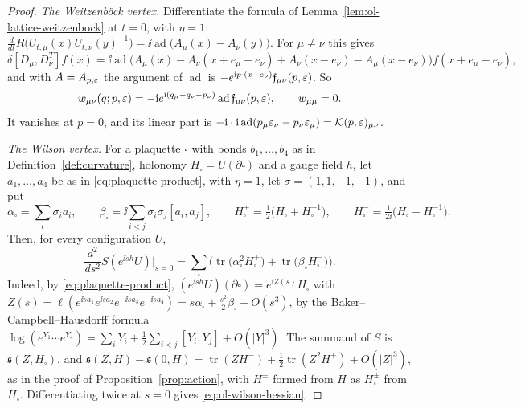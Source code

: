\begin{proof}
\emph{The Weitzenb\"ock vertex.} Differentiate the formula of Lemma~\ref{lem:ol-lattice-weitzenbock} at $t=0$, with $\eta=1$: $\frac d{dt}R\big(U_{t,\mu}(x)U_{t,\nu}(y)^{-1}\big)=\ii\operatorname{ad}\big(A_\mu(x)-A_\nu(y)\big)$. For $\mu\ne\nu$ this gives
\[
\delta[D_\mu,D_\nu^T]f(x)=\ii\operatorname{ad}\big(A_\mu(x)-A_\nu(x+e_\mu-e_\nu)+A_\nu(x-e_\nu)-A_\mu(x-e_\nu)\big)f(x+e_\mu-e_\nu),
\]
and with $A=A_{p,\varepsilon}$ the argument of $\operatorname{ad}$ is $-e^{\mathrm i p\cdot(x-e_\nu)}\mathfrak f_{\mu\nu}(p,\varepsilon)$. So
\[
w_{\mu\nu}(q;p,\varepsilon)=-\mathrm i e^{\mathrm i(q_\mu-q_\nu-p_\nu)}\operatorname{ad}\mathfrak f_{\mu\nu}(p,\varepsilon),\qquad w_{\mu\mu}=0 .
\]
It vanishes at $p=0$, and its linear part is $-\mathrm i\cdot\mathrm i\operatorname{ad}(p_\mu\varepsilon_\nu-p_\nu\varepsilon_\mu)=\mathcal K(p,\varepsilon)_{\mu\nu}$.

\emph{The Wilson vertex.} For a plaquette $\square$ with bonds $b_1,\dots,b_4$ as in Definition~\ref{def:curvature}, holonomy $H_\square=U(\partial\square)$ and a gauge field $h$, let $a_1,\dots,a_4$ be as in \eqref{eq:plaquette-product}, with $\eta=1$, let $\sigma=(1,1,-1,-1)$, and put
\[
\alpha_\square=\sum_i\sigma_ia_i,\qquad\beta_\square=\ii\sum_{i<j}\sigma_i\sigma_j[a_i,a_j],\qquad H^+_\square=\tfrac12\big(H_\square+H_\square^{-1}\big),\qquad H^-_\square=\tfrac1{2\ii}\big(H_\square-H_\square^{-1}\big).
\]
Then, for every configuration $U$,
\begin{equation}\label{eq:ol-wilson-hessian}
\frac{d^2}{ds^2}S(e^{\ii sh}U)\Big|_{s=0}=\sum_\square\Big(\operatorname{tr}\big(\alpha_\square^2H^+_\square\big)+\operatorname{tr}\big(\beta_\square H^-_\square\big)\Big).
\end{equation}
Indeed, by \eqref{eq:plaquette-product}, $(e^{\ii sh}U)(\partial\square)=e^{\ii Z(s)}H_\square$ with $Z(s)=\ell(e^{\ii sa_1}e^{\ii sa_2}e^{-\ii sa_3}e^{-\ii sa_4})=s\alpha_\square+\frac{s^2}2\beta_\square+O(s^3)$, by the Baker--Campbell--Hausdorff formula $\log(e^{Y_1}\cdots e^{Y_4})=\sum_iY_i+\frac12\sum_{i<j}[Y_i,Y_j]+O(|Y|^3)$. The summand of $S$ is $\mathfrak s(Z,H_\square)$, and $\mathfrak s(Z,H)-\mathfrak s(0,H)=\operatorname{tr}(ZH^-)+\frac12\operatorname{tr}(Z^2H^+)+O(|Z|^3)$, as in the proof of Proposition~\ref{prop:action}, with $H^\pm$ formed from $H$ as $H^\pm_\square$ from $H_\square$. Differentiating twice at $s=0$ gives \eqref{eq:ol-wilson-hessian}.


\end{proof}
